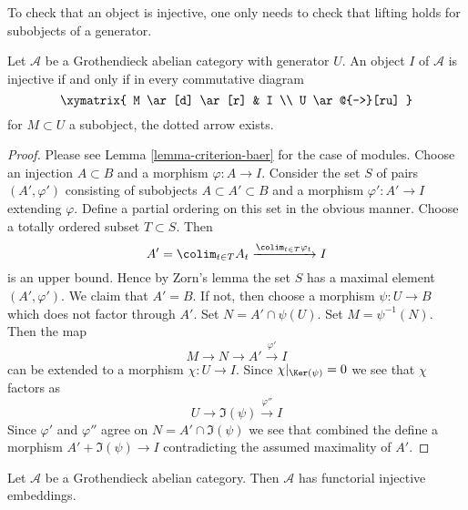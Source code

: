 \begin{lemma}
\label{lemma-characterize-injective}
\begin{slogan}
To check that an object is injective, one only needs to check that lifting
holds for subobjects of a generator.
\end{slogan}
Let $\mathcal{A}$ be a Grothendieck abelian category with generator $U$.
An object $I$ of $\mathcal{A}$ is injective if and only if in every
commutative diagram
$$
\xymatrix{
M \ar[d] \ar[r] &  I \\
U \ar@{-->}[ru]
}
$$
for $M \subset U$ a subobject, the dotted arrow exists.
\end{lemma}

\begin{proof}
Please see Lemma \ref{lemma-criterion-baer} for the case of modules.
Choose an injection $A \subset B$ and a morphism $\varphi : A \to I$.
Consider the set $S$ of pairs $(A', \varphi')$ consisting of
subobjects $A \subset A' \subset B$ and a morphism $\varphi' : A' \to I$
extending $\varphi$. Define a partial ordering on this set in the obvious
manner. Choose a totally ordered subset $T \subset S$. Then
$$
A' = \colim_{t \in T} A_t \xrightarrow{\colim_{t \in T} \varphi_t} I
$$
is an upper bound. Hence by Zorn's lemma the set $S$ has a maximal element
$(A', \varphi')$. We claim that $A' = B$. If not, then choose a morphism
$\psi : U \to B$ which does not factor through $A'$. Set
$N = A' \cap \psi(U)$. Set $M = \psi^{-1}(N)$. Then the map
$$
M \to N \to A' \xrightarrow{\varphi'} I
$$
can be extended to a morphism $\chi : U \to I$. Since
$\chi|_{\Ker(\psi)} = 0$ we see that $\chi$ factors as
$$
U \to \Im(\psi) \xrightarrow{\varphi''} I
$$
Since $\varphi'$ and $\varphi''$ agree on $N = A' \cap \Im(\psi)$
we see that combined the define a morphism $A' + \Im(\psi) \to I$
contradicting the assumed maximality of $A'$.
\end{proof}

\begin{theorem}
\label{theorem-injective-embedding-grothendieck}
Let $\mathcal{A}$ be a Grothendieck abelian category.
Then $\mathcal{A}$ has functorial injective embeddings.
\end{theorem}

